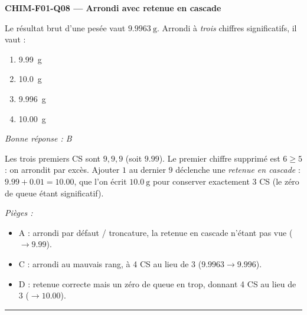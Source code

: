 \documentclass[11pt,a4paper]{article}
\begin{document}
\noindent\textbf{CHIM-F01-Q08 --- Arrondi avec retenue en cascade}\par
Le résultat brut d'une pesée vaut $\qty{9.9963}{\gram}$. Arrondi à \emph{trois} chiffres significatifs, il vaut :
\begin{enumerate}[label=\Alph*)]
\item \qty{9.99}{\gram}
\item \qty{10.0}{\gram}
\item \qty{9.996}{\gram}
\item \qty{10.00}{\gram}
\end{enumerate}
\textit{Bonne réponse : B}\par
Les trois premiers CS sont $9, 9, 9$ (soit $\num{9.99}$). Le premier chiffre supprimé est $6 \ge 5$ : on arrondit par excès. Ajouter $1$ au dernier $9$ déclenche une \emph{retenue en cascade} : $\num{9.99}+\num{0.01} = \num{10.00}$, que l'on écrit $\qty{10.0}{\gram}$ pour conserver exactement 3 CS (le zéro de queue étant significatif).\par
\textit{Pièges :}
\begin{itemize}
\item A : arrondi par défaut / troncature, la retenue en cascade n'étant pas vue ($\to \num{9.99}$).
\item C : arrondi au mauvais rang, à 4 CS au lieu de 3 ($\num{9.9963} \to \num{9.996}$).
\item D : retenue correcte mais un zéro de queue en trop, donnant 4 CS au lieu de 3 ($\to \num{10.00}$).
\end{itemize}
\vspace{6pt}\hrule\vspace{8pt}
\end{document}
